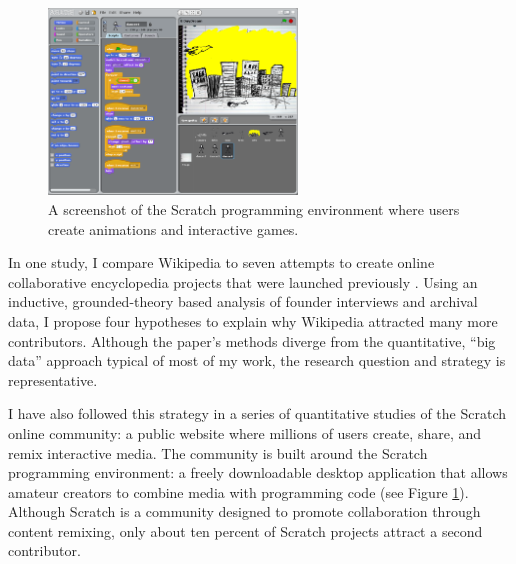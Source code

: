 \documentclass[10pt]{memoir}
\begin{document}

\begin{figure}
 \begin{centering}
 \includegraphics[width=2.6in]{figures/scratch_screenshot_default.png}
 \caption{A screenshot of the Scratch programming environment
   where users create animations and interactive games.}
 \label{fig:scratchapp}
 \end{centering}
 \vspace{-2em}
\end{figure}

In one study, I compare Wikipedia to seven attempts to create online
collaborative encyclopedia projects that were launched previously
\cite{hill_almost_2012}. Using an inductive, grounded-theory based
analysis of founder interviews and archival data, I propose four
hypotheses to explain why Wikipedia attracted many more
contributors. Although the paper's methods diverge from the
quantitative, ``big data'' approach typical of most of my work, the
research question and strategy is representative.

I have also followed this strategy in a series of quantitative studies
of the Scratch online community: a public website where millions
of users create, share, and remix interactive media. The
community is built around the Scratch programming environment: a
freely downloadable desktop application that allows amateur creators
to combine media with programming code (see Figure
\ref{fig:scratchapp}). Although Scratch is a community designed to
promote collaboration through content remixing, only about ten percent
of Scratch projects attract a second contributor.
\end{document}
